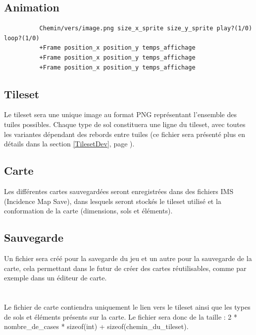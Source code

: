 \documentclass[a4paper]{article}
\newcommand{\alinea}{\hspace*{0.5cm}}
\begin{document}
      \subsection{Animation}
        \begin{verbatim}
          Chemin/vers/image.png size_x_sprite size_y_sprite play?(1/0) loop?(1/0)
          +Frame position_x position_y temps_affichage
          +Frame position_x position_y temps_affichage
          +Frame position_x position_y temps_affichage
        \end{verbatim}
      
      \subsection{Tileset}
	    \alinea Le tileset sera une unique image au format PNG représentant l'ensemble des tuiles possibles. Chaque type de sol constituera une ligne du tileset, avec toutes les variantes dépendant des rebords entre tuiles (ce fichier sera présenté plus en détails dans la section \ref{TilesetDev}, page \pageref{TilesetDev}).

      \subsection{Carte}
	    \alinea Les différentes cartes sauvegardées seront enregistrées dans des fichiers IMS (Incidence Map Save), dans lesquels seront stockés le tileset utilisé et la conformation de la carte (dimensions, sols et éléments).
      
      \subsection{Sauvegarde}
		\alinea Un fichier sera créé pour la savegarde du jeu et un autre pour la sauvegarde de la carte, cela permettant dans le futur de créer des cartes réutilisables, comme par exemple dans un éditeur de carte.\\
		\\
		\alinea %
		\\
		\alinea Le fichier de carte contiendra uniquement le lien vers le tileset ainsi que les types de sols et éléments présents sur la carte. Le fichier sera donc de la taille : 2 * nombre_de_cases * sizeof(int) + sizeof(chemin_du_tileset).\\
      
\end{document}
